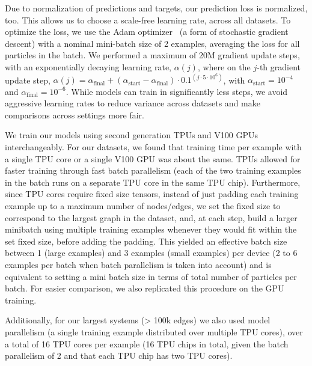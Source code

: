 \documentclass{article}
\begin{document}
Due to normalization of predictions and targets, our prediction loss is normalized, too. This allows us to choose a scale-free learning rate, across all datasets. 
To optimize the loss, we use the Adam optimizer~\cite{kingma2014adam} (a form of stochastic gradient descent) with a nominal mini-batch size of 2 examples, averaging the loss for all particles in the batch. We performed a maximum of 20M gradient update steps, with an exponentially decaying learning rate, $\alpha(j)$, where on the $j$-th gradient update step, ${\alpha(j) = \alpha_{\mathrm{final}} + (\alpha_{\mathrm{start}} - \alpha_{\mathrm{final}}) \cdot 0.1^{(j \cdot 5 \cdot 10^6)}}$, with $\alpha_{\mathrm{start}} = 10^{-4}$ and $\alpha_{\mathrm{final}} = 10^{-6}$. While models can train in significantly less steps, we avoid aggressive learning rates to reduce variance across datasets and make comparisons across settings more fair.

We train our models using second generation TPUs and V100 GPUs interchangeably. For our datasets, we found that training time per example with a single TPU core or a single V100 GPU was about the same. TPUs allowed for faster training through fast batch parallelism (each of the two training examples in the batch runs on a separate TPU core in the same TPU chip). Furthermore, since TPU cores require fixed size tensors, instead of just padding each training example up to a maximum number of nodes/edges, we set the fixed size to correspond to the largest graph in the dataset, and, at each step, build a larger minibatch using multiple training examples whenever they would fit within the set fixed size, before adding the padding. This yielded an effective batch size between 1 (large examples) and 3 examples (small examples) per device (2 to 6 examples per batch when batch parallelism is taken into account) and is equivalent to setting a mini batch size in terms of total number of particles per batch. For easier comparison, we also replicated this procedure on the GPU training. 

Additionally, for our largest systems (> 100k edges) we also used model parallelism (a single training example distributed over multiple TPU cores)\cite{kumar2019scale}, over a total of 16 TPU cores per example (16 TPU chips in total, given the batch parallelism of 2 and that each TPU chip has two TPU cores).
\end{document}
